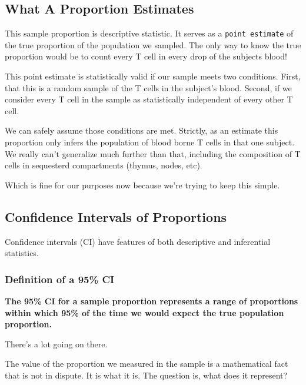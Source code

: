 \documentclass[]{book}
\begin{document}
\hypertarget{what-a-proportion-estimates}{%
\subsection{What A Proportion Estimates}\label{what-a-proportion-estimates}}

This sample proportion is descriptive statistic. It serves as a \texttt{point\ estimate} of the true proportion of the population we sampled. The only way to know the true proportion would be to count every T cell in every drop of the subjects blood!

This point estimate is statistically valid if our sample meets two conditions. First, that this is a random sample of the T cells in the subject's blood. Second, if we consider every T cell in the sample as statistically independent of every other T cell.

We can safely assume those conditions are met. Strictly, as an estimate this proportion only infers the population of blood borne T cells in that one subject. We really can't generalize much further than that, including the composition of T cells in sequesterd compartments (thymus, nodes, etc).

Which is fine for our purposes now because we're trying to keep this simple.

\hypertarget{confidence-intervals-of-proportions}{%
\subsection{Confidence Intervals of Proportions}\label{confidence-intervals-of-proportions}}

Confidence intervals (CI) have features of both descriptive and inferential statistics.

\hypertarget{definition-of-a-95-ci}{%
\subsubsection{Definition of a 95\% CI}\label{definition-of-a-95-ci}}

\textbf{The 95\% CI for a sample proportion represents a range of proportions within which 95\% of the time we would expect the true population proportion.}

There's a lot going on there.

The value of the proportion we measured in the sample is a mathematical fact that is not in dispute. It is what it is. The question is, what does it represent?
\end{document}
